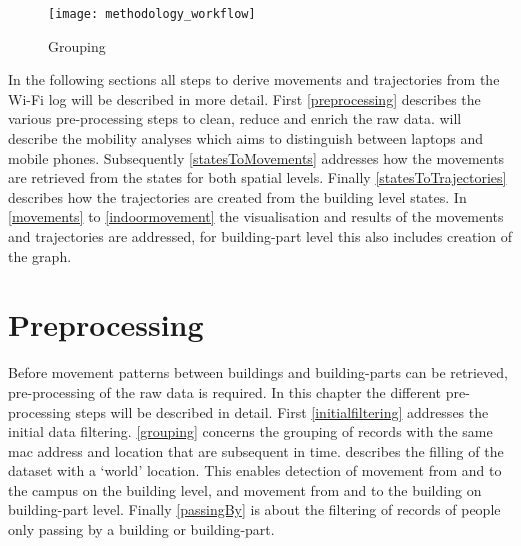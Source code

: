 \begin{figure}[H]
\centering
\texttt{[image: methodology\_workflow]}
\captionsetup{justification=centering}
\caption{Grouping}
\label{figure:workflow}
\end{figure}
In the following sections all steps to derive movements and trajectories from the Wi-Fi log will be described in more detail. First \autoref{preprocessing} describes the various pre-processing steps to clean, reduce and enrich the raw data.  will describe the mobility analyses which aims to distinguish between laptops and mobile phones. Subsequently \autoref{statesToMovements} addresses how the movements are retrieved from the states for both spatial levels. Finally \autoref{statesToTrajectories} describes how the trajectories are created from the building level states. In \autoref{movements} to \autoref{indoormovement} the visualisation and results of the movements and trajectories are addressed, for building-part level this also includes creation of the graph. 

\section{Preprocessing}\label{preprocessing}
Before movement patterns between buildings and building-parts can be retrieved, pre-processing of the raw data is required. In this chapter the different pre-processing steps will be described in detail. First \autoref{initialfiltering} addresses the initial data filtering. \autoref{grouping} concerns the grouping of records with the same mac address and location that are subsequent in time.  describes the filling of the dataset with a ‘world’ location. This enables detection of movement from and to the campus on the building level, and movement from and to the building on building-part level. Finally \autoref{passingBy} is about the filtering of records of people only passing by a building or building-part.


